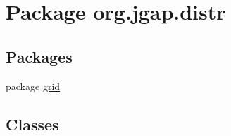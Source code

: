 \hypertarget{namespaceorg_1_1jgap_1_1distr}{\section{Package org.\-jgap.\-distr}
\label{namespaceorg_1_1jgap_1_1distr}
}
\subsection*{Packages}
\begin{DoxyCompactItemize}
\item 
package \hyperlink{namespaceorg_1_1jgap_1_1distr_1_1grid}{grid}
\end{DoxyCompactItemize}
\subsection*{Classes}
